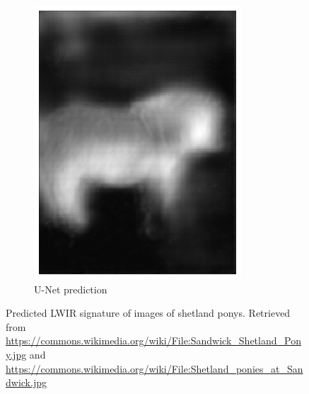 \documentclass{l4proj}
\begin{document}
\begin{figure}[ht]
\begin{subfigure}[h!]{0.25\textwidth}
    \includegraphics[width=\textwidth]{images/unet/pony_predicted.png}
    \caption{U-Net prediction}
  \end{subfigure}
  \caption{Predicted LWIR signature of images of shetland ponys. Retrieved from \url{https://commons.wikimedia.org/wiki/File:Sandwick_Shetland_Pony.jpg} and \url{https://commons.wikimedia.org/wiki/File:Shetland_ponies_at_Sandwick.jpg}}
  \label{fig:autoencoder_pony}
\end{figure}
\end{document}
